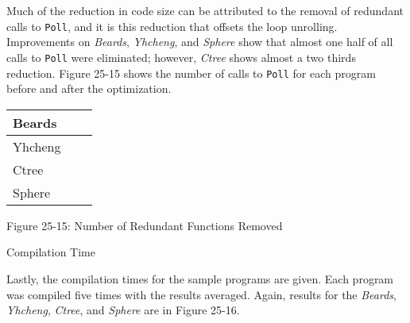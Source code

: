 Much of the reduction in code size can be attributed to the removal of
redundant calls to \texttt{Poll}, and it is this reduction that
offsets the loop unrolling. Improvements on \textit{Beards},
\textit{Yhcheng}, and \textit{Sphere} show that almost one half of all
calls to \texttt{Poll} were eliminated; however, \textit{Ctree} shows
almost a two thirds reduction. Figure 25-15 shows the number of calls
to \texttt{Poll} for each program before and after the optimization.

\begin{center}
\tabletail{}
\tablelasttail{}
\begin{supertabular}{|m{0.9406598in}|m{0.76435983in}|m{0.6712598in}|}
\hline
 Beards &
 &
\raggedleft{}\\\hline
 Yhcheng &
 &
\raggedleft{}\\\hline
 Ctree &
 &
\raggedleft{}\\\hline
 Sphere &
 &
\raggedleft{}\\\hline
\end{supertabular}
\end{center}
{\centering{}
Figure 25-15: Number of Redundant Functions Removed
\par}

{\sffamily
Compilation Time}

Lastly, the compilation times for the sample programs are given. Each
program was compiled five times with the results averaged. Again,
results for the \textit{Beards}, \textit{Yhcheng}, \textit{Ctree}, and
\textit{Sphere} are in Figure 25-16.


